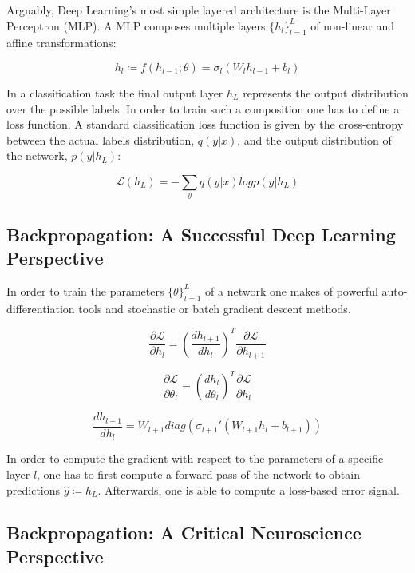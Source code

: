 \documentclass{article}
\theoremstyle{definition}
\begin{document}
Arguably, Deep Learning's most simple layered architecture is the Multi-Layer Perceptron (MLP). A MLP composes multiple layers $\{h_l\}_{l=1}^L$ of non-linear and affine transformations:

$$h_l \coloneqq f(h_{l-1}; \theta) = \sigma_l (W_l h_{l-1} + b_l)$$ 

In a classification task the final output layer $h_L$ represents the output distribution over the possible labels. In order to train such a composition one has to define a loss function. A standard classification loss function is given by the cross-entropy between the actual labels distribution, $q(y|x)$, and the output distribution of the network, $p(y|h_L)$:

$$\mathcal{L}(h_L) = - \sum_y q(y|x) log p(y|h_L)$$

\subsection*{Backpropagation: A Successful Deep Learning Perspective}

In order to train the parameters $\{\theta\}_{l=1}^L$ of a network one makes of powerful auto-differentiation tools and stochastic or batch gradient descent methods.

\begin{equation}
	\frac{\partial \mathcal{L}}{\partial h_l} = \left(\frac{dh_{l+1}}{d h_{l}}\right)^T \frac{\partial \mathcal{L}}{\partial h_{l+1}}
\end{equation}

\begin{equation}
	\frac{\partial \mathcal{L}}{\partial \theta_l} = \left(\frac{dh_{l}}{d \theta_{l}}\right)^T \frac{\partial \mathcal{L}}{\partial h_{l}}
\end{equation}

\begin{equation}
	\frac{dh_{l+1}}{dh_l} = W_{l+1} diag\left(\sigma_{l+1}'(W_{l+1}h_l +b_{l+1})\right)
\end{equation}

In order to compute the gradient with respect to the parameters of a specific layer $l$, one has to first compute a forward pass of the network to obtain predictions $\hat{y} \coloneqq h_L$. Afterwards, one is able to compute a loss-based error signal. 

\subsection*{Backpropagation: A Critical Neuroscience Perspective}
\end{document}
